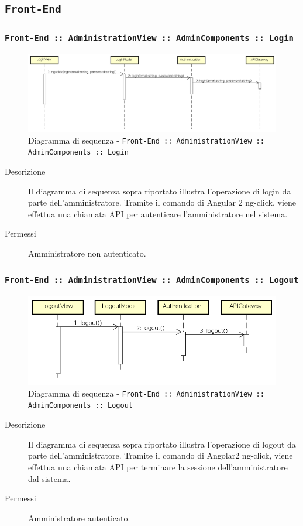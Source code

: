 \documentclass[../DefinizioneDiProdotto_v3.0.0.tex]{subfiles}
\begin{document}
\newpage
\subsection{\texttt{Front-End}}
\subsubsection{\texttt{Front-End :: AdministrationView :: AdminComponents :: Login}}
\begin{figure}[!h]
	\centering
	\includegraphics[width=\textwidth]{DiagrammiSequenza/Front-End/AdministrationView/Login.png}
	\caption{Diagramma di sequenza - \texttt{Front-End :: AdministrationView :: AdminComponents :: Login} }
\end{figure}
\begin{description}
	\item [Descrizione] Il diagramma di sequenza sopra riportato illustra l'operazione di login da parte dell'amministratore. Tramite il comando di Angular 2 ng-click, viene effettua una chiamata API per autenticare l'amministratore nel sistema.
	\item [Permessi] Amministratore non autenticato.
\end{description}

\newpage
\subsubsection{\texttt{Front-End :: AdministrationView :: AdminComponents :: Logout}}
\begin{figure}[!h]
	\centering
	\includegraphics[width=\textwidth]{DiagrammiSequenza/Front-End/AdministrationView/Logout.png}
	\caption{Diagramma di sequenza - \texttt{Front-End :: AdministrationView :: AdminComponents :: Logout }}
\end{figure}
\begin{description}
	\item [Descrizione] Il diagramma di sequenza sopra riportato illustra l'operazione di logout da parte dell'amministratore. Tramite il comando di Angolar2 ng-click, viene effettua una chiamata API per terminare la sessione dell'amministratore dal sistema.
	\item [Permessi] Amministratore autenticato.
\end{description}
\end{document}
